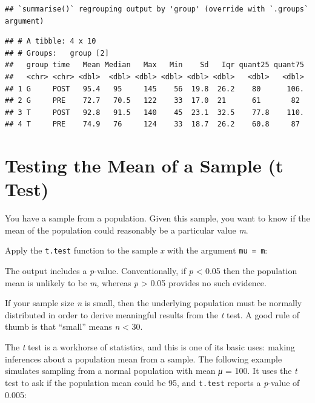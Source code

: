 \documentclass[
]{book}
\newenvironment{Shaded}{\begin{snugshade}}{\end{snugshade}}
\newcommand{\CommentTok}[1]{\textcolor[rgb]{0.56,0.35,0.01}{\textit{#1}}}
\newcommand{\DataTypeTok}[1]{\textcolor[rgb]{0.13,0.29,0.53}{#1}}
\newcommand{\DecValTok}[1]{\textcolor[rgb]{0.00,0.00,0.81}{#1}}
\newcommand{\KeywordTok}[1]{\textcolor[rgb]{0.13,0.29,0.53}{\textbf{#1}}}
\newcommand{\NormalTok}[1]{#1}
\newcommand{\OperatorTok}[1]{\textcolor[rgb]{0.81,0.36,0.00}{\textbf{#1}}}
\newcommand{\StringTok}[1]{\textcolor[rgb]{0.31,0.60,0.02}{#1}}
\begin{document}
\begin{verbatim}
## `summarise()` regrouping output by 'group' (override with `.groups` argument)
\end{verbatim}

\begin{verbatim}
## # A tibble: 4 x 10
## # Groups:   group [2]
##   group time   Mean Median   Max   Min    Sd   Iqr quant25 quant75
##   <chr> <chr> <dbl>  <dbl> <dbl> <dbl> <dbl> <dbl>   <dbl>   <dbl>
## 1 G     POST   95.4   95     145    56  19.8  26.2    80      106.
## 2 G     PRE    72.7   70.5   122    33  17.0  21      61       82 
## 3 T     POST   92.8   91.5   140    45  23.1  32.5    77.8    110.
## 4 T     PRE    74.9   76     124    33  18.7  26.2    60.8     87
\end{verbatim}

\hypertarget{testing-the-mean-of-a-sample-t-test}{%
\section{Testing the Mean of a Sample (t Test)}\label{testing-the-mean-of-a-sample-t-test}}

You have a sample from a population. Given this sample, you want to know
if the mean of the population could reasonably be a particular value \emph{m}.

Apply the \texttt{t.test} function to the sample \emph{x} with the argument \texttt{mu\ =\ m}:

\begin{Shaded}
\end{Shaded}

The output includes a \emph{p}-value. Conventionally, if \emph{p} \textless{} 0.05 then
the population mean is unlikely to be \emph{m}, whereas \emph{p} \textgreater{} 0.05 provides
no such evidence.

If your sample size \emph{n} is small, then the underlying population must be
normally distributed in order to derive meaningful results from the \emph{t}
test. A good rule of thumb is that ``small'' means \emph{n} \textless{} 30.

The \emph{t} test is a workhorse of statistics, and this is one of its basic
uses: making inferences about a population mean from a sample. The
following example simulates sampling from a normal population with mean
\emph{μ} = 100. It uses the \emph{t} test to ask if the population mean could be
95, and \texttt{t.test} reports a \emph{p}-value of 0.005:
\end{document}
